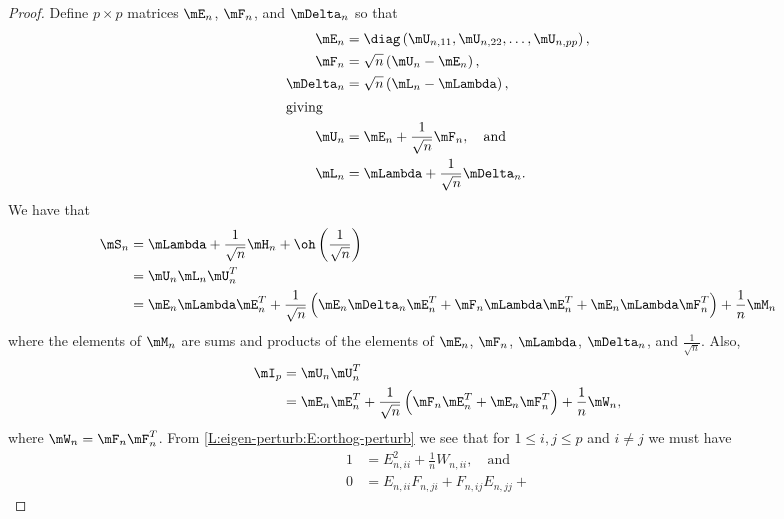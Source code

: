 \begin{proof}
Define $p\times p$ matrices $\mE_n$, $\mF_n$, and $\mDelta_n$ so that
\begin{align}
    \mE_n
        &=
        \diag \left(
            \mU_{n,11},
            \mU_{n,22},
            \ldots,
            \mU_{n,pp}
        \right), \\
    \mF_n 
        &= 
        \sqrt{n} \left( \mU_n - \mE_n \right), \\
    \mDelta_{n}
        &=
        \sqrt{n} \left( \mL_n - \mLambda \right), \\
\intertext{giving}
    \mU_n
        &= \mE_n + \frac{1}{\sqrt{n}} \mF_n, \quad \text{and} \notag \\
    \mL_n
        &= \mLambda + \frac{1}{\sqrt{n}} \mDelta_{n}. \notag
\end{align}
We have that 
\begin{align}
    \mS_n 
    &= \mLambda 
       + \frac{1}{\sqrt{n}} \mH_n 
       + \oh \left( \frac{1}{\sqrt{n}}\right) \notag \\
    &= \mU_n \mL_n \mU_n^T \notag \\
    &= \mE_n \mLambda \mE_n^T
       + 
       \frac{1}{\sqrt{n}} \left(
           \mE_n \mDelta_n \mE_n^T
           +
           \mF_n \mLambda \mE_n^T
           +
           \mE_n \mLambda \mF_n^T
       \right)
       +
       \frac{1}{n}
       \mM_n \label{L:eigen-perturb:E:eigen-perturb}
\end{align}
where the elements of $\mM_n$ are sums and products of the elements of $\mE_n$, $\mF_n$, $\mLambda$, $\mDelta_n$, and $\frac{1}{\sqrt{n}}$.  Also,
\begin{align}
    \mI_p
    &= \mU_n \mU_n^T \notag \\
    &= \mE_n \mE_n^T
       + 
       \frac{1}{\sqrt{n}} \left(
           \mF_n \mE_n^T
           +
           \mE_n \mF_n^T
       \right)
       + 
       \frac{1}{n}
       \mW_n, \label{L:eigen-perturb:E:orthog-perturb}
\end{align}
where $\mW_n = \mF_n \mF_n^T$.
From \eqref{L:eigen-perturb:E:orthog-perturb} we see that for $1 \leq i,j \leq p$ and $i \neq j$ we must have
\begin{subequations}
\begin{align}
    1 &= E_{n,ii}^2 
         + 
         \frac{1}{n} W_{n,ii}, 
         \quad \text{and}
         \label{L:eigen-perturb:E:orthog-perturb-1} \\
    0 &= E_{n,ii} F_{n,ji} 
         + 
         F_{n,ij} E_{n,jj} 
         + 

\end{align}
\end{subequations}
\end{proof}
